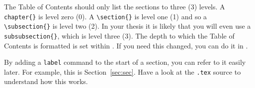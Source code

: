 The Table of Contents should only list the sections to three (3)
levels. A \verb|chapter{}| is level zero (0). A \verb|\section{}| is
level one (1) and so a \verb|\subsection{}| is level two (2). In your
thesis it is likely that you will even use a \verb|subsubsection{}|,
which is level three (3). The depth to which the Table of Contents is
formatted is set within . If you need this changed, you
can do it in .

By adding a \texttt{label} command to the start of a section, you can
refer to it easily later. For example, this is
Section~\ref{sec:sec}. Have a look at the \texttt{.tex} source to
understand how this works.


